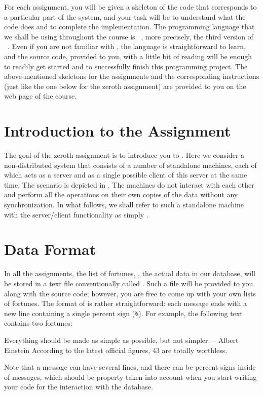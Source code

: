 \documentclass[a4paper,10pt]{article}
\begin{document}
For each assignment, you will be given a skeleton of the code that corresponds
to a particular part of the system, and your task will be to understand what the
code does and to complete the implementation. The programming language that we
shall be using throughout the course is \python\ \cite{language}, more
precisely, the third version of \python\ \cite{python}. Even if you are not
familiar with \python, the language is straightforward to learn, and the source
code, provided to you, with a little bit of reading \cite{python-tutorial,
python-library} will be enough to readily get started and to successfully finish
this programming project. The above-mentioned skeletons for the assignments and
the corresponding instructions (just like the one below for the zeroth
assignment) are provided to you on the web page \cite{course} of the course.

\section{Introduction to the Assignment}

The goal of the zeroth assignment is to introduce you to \python. Here we
consider a non-distributed system that consists of a number of standalone
machines, each of which acts as a server and as a single possible client of this
server at the same time. The scenario is depicted in .
The machines do not interact with each other and perform all the operations on
their own copies of the data without any synchronization. In what follows, we
shall refer to such a standalone machine with the server/client functionality as
simply .

\section{Data Format} 
In all the assignments, the list of fortunes, \ie, the actual data in our
database, will be stored in a text file conventionally called
. Such a file will be provided to you along with the source
code; however, you are free to come up with your own lists of fortunes. The
format of  is rather straightforward: each message ends
with a new line containing a single percent sign (\texttt{\%}). For example, the
following text contains two fortunes:
\begin{fortune}
Everything should be made as simple as possible, but not simpler.
    -- Albert Einstein
%
According to the latest official figures, 43%
are totally worthless.
%
\end{fortune}
Note that a message can have several lines, and there can be percent signs
inside of messages, which should be property taken into account when you start
writing your code for the interaction with the database.
\end{document}
